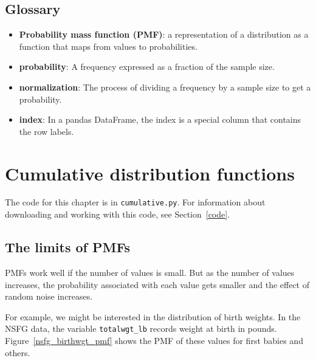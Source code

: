 \documentclass[12pt]{book}
\begin{document}
\section{Glossary}

\begin{itemize}

\item {\bf Probability mass function (PMF)}: a representation of a distribution
as a function that maps from values to probabilities.

\item {\bf probability}: A frequency expressed as a fraction of the sample
size.

\item {\bf normalization}: The process of dividing a frequency by a sample
size to get a probability.

\item {\bf index}: In a pandas DataFrame, the index is a special column
that contains the row labels.

\end{itemize}


\chapter{Cumulative distribution functions}
\label{cumulative}

The code for this chapter is in {\tt cumulative.py}.
For information about downloading and
working with this code, see Section~\ref{code}.


\section{The limits of PMFs}

PMFs work well if the number of values is small.  But as the number of
values increases, the probability associated with each value gets
smaller and the effect of random noise increases.

For example, we might be interested in the distribution of birth
weights.  In the NSFG data, the variable \verb"totalwgt_lb" records
weight at birth in pounds.  Figure~\ref{nsfg_birthwgt_pmf} shows
the PMF of these values for first babies and others.
  
\end{document}
